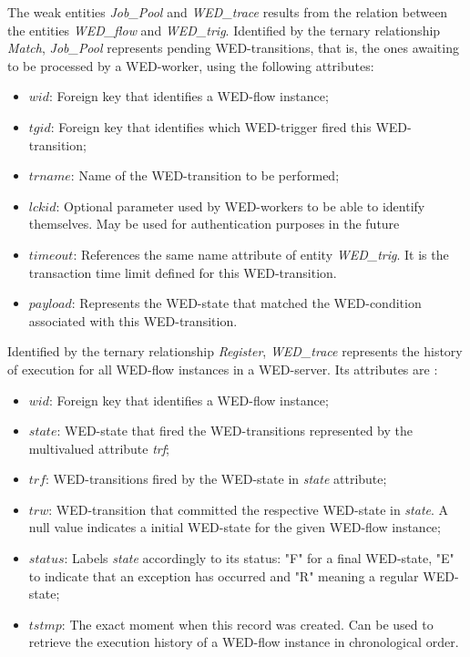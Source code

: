 \documentclass[12pt]{article}
\begin{document}
\par The weak entities \emph{Job\_Pool} and \emph{WED\_trace} results from the relation between the entities \emph{WED\_flow} and 
\emph{WED\_trig}. Identified by the ternary relationship \emph{Match}, \emph{Job\_Pool} represents pending WED-transitions, that is,
the ones awaiting to be processed by a WED-worker, using the following attributes:

\begin{itemize}
\item $wid$: Foreign key that identifies a WED-flow instance;
\item $tgid$: Foreign key that identifies which WED-trigger fired this WED-transition;
\item $trname$: Name of the WED-transition to be performed;
\item $lckid$: Optional parameter used by WED-workers to be able to identify themselves. May be used for authentication
               purposes in the future  
\item $timeout$: References the same name attribute of entity \emph{WED\_trig}. It is the transaction time limit defined for this WED-transition.  
\item $payload$: Represents the WED-state that matched the WED-condition associated with this WED-transition. 
\end{itemize}

Identified by the ternary relationship \emph{Register}, \emph{WED\_trace} represents the history of execution for all WED-flow
instances in a WED-server. Its attributes are :

\begin{itemize}  
\item $wid$: Foreign key that identifies a WED-flow instance;
\item $state$: WED-state that fired the WED-transitions represented by the multivalued attribute \emph{trf};  
\item $trf$: WED-transitions fired by the WED-state in \emph{state} attribute;
\item $trw$: WED-transition that committed the respective WED-state in \emph{state}. A null value indicates a initial WED-state for
             the given WED-flow instance;
\item $status$: Labels \emph{state} accordingly to its status: "F" for a final WED-state, "E" to indicate that an exception has occurred
               and "R" meaning a regular WED-state;
\item $tstmp$: The exact moment when this record was created. Can be used to retrieve the execution history of a WED-flow instance
              in chronological order. 
\end{itemize}
\end{document}
